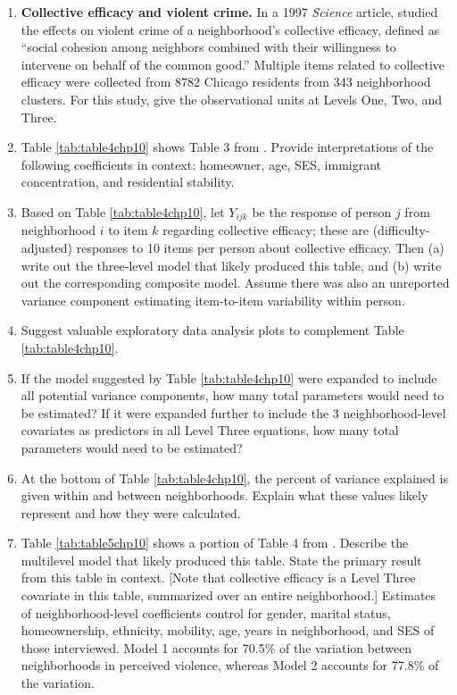 \documentclass[
]{krantz}
\begin{document}
\begin{enumerate}
\def\labelenumi{\arabic{enumi}.}
\setcounter{enumi}{15}
\item
  \textbf{Collective efficacy and violent crime.} In a 1997 \emph{Science} article, \citet{Sampson1997} studied the effects on violent crime of a neighborhood's collective efficacy, defined as ``social cohesion among neighbors combined with their willingness to intervene on behalf of the common good.'' Multiple items related to collective efficacy were collected from 8782 Chicago residents from 343 neighborhood clusters. For this study, give the observational units at Levels One, Two, and Three.
\item
  Table \ref{tab:table4chp10} shows Table 3 from \citet{Sampson1997}. Provide interpretations of the following coefficients in context: homeowner, age, SES, immigrant concentration, and residential stability.
\item
  Based on Table \ref{tab:table4chp10}, let \(Y_{ijk}\) be the response of person \(j\) from neighborhood \(i\) to item \(k\) regarding collective efficacy; these are (difficulty-adjusted) responses to 10 items per person about collective efficacy. Then (a) write out the three-level model that likely produced this table, and (b) write out the corresponding composite model. Assume there was also an unreported variance component estimating item-to-item variability within person.
\item
  Suggest valuable exploratory data analysis plots to complement Table \ref{tab:table4chp10}.
\item
  If the model suggested by Table \ref{tab:table4chp10} were expanded to include all potential variance components, how many total parameters would need to be estimated? If it were expanded further to include the 3 neighborhood-level covariates as predictors in all Level Three equations, how many total parameters would need to be estimated?
\item
  At the bottom of Table \ref{tab:table4chp10}, the percent of variance explained is given within and between neighborhoods. Explain what these values likely represent and how they were calculated.
\item
  Table \ref{tab:table5chp10} shows a portion of Table 4 from \citet{Sampson1997}. Describe the multilevel model that likely produced this table. State the primary result from this table in context. {[}Note that collective efficacy is a Level Three covariate in this table, summarized over an entire neighborhood.{]} Estimates of neighborhood-level coefficients control for gender, marital status, homeownership, ethnicity, mobility, age, years in neighborhood, and SES of those interviewed. Model 1 accounts for 70.5\% of the variation between neighborhoods in perceived violence, whereas Model 2 accounts for 77.8\% of the variation.
\end{enumerate}
\end{document}
